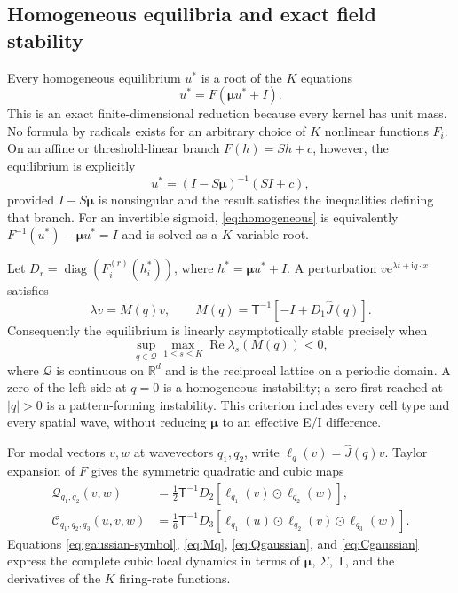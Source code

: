 \documentclass[11pt]{article}
\newcommand{\ii}{\mathrm{i}}
\newcommand{\ee}{\mathrm{e}}
\newcommand{\RePart}{\operatorname{Re}}
\newcommand{\T}{\mathsf T}
\newcommand{\Mu}{\bm{\mu}}
\newcommand{\cQ}{\mathcal Q}
\newcommand{\cC}{\mathcal C}
\begin{document}
\subsection{Homogeneous equilibria and exact field stability}

Every homogeneous equilibrium $u^*$ is a root of the $K$ equations
\begin{equation}
 u^*=F(\Mu u^*+I).
 \label{eq:homogeneous}
\end{equation}
This is an exact finite-dimensional reduction because every kernel has unit
mass.  No formula by radicals exists for an arbitrary choice of $K$ nonlinear
functions $F_i$.  On an affine or threshold-linear branch
$F(h)=Sh+c$, however, the equilibrium is explicitly
\begin{equation}
 u^*=(I-S\Mu)^{-1}(SI+c),
 \label{eq:affine-equilibrium}
\end{equation}
provided $I-S\Mu$ is nonsingular and the result satisfies the inequalities
defining that branch.  For an invertible sigmoid, \eqref{eq:homogeneous} is
equivalently $F^{-1}(u^*)-\Mu u^*=I$ and is solved as a $K$-variable root.

Let $D_r=\operatorname{diag}(F_i^{(r)}(h_i^*))$, where
$h^*=\Mu u^*+I$.  A perturbation $v\ee^{\lambda t+\ii q\cdot x}$ satisfies
\begin{equation}
 \lambda v=M(q)v,\qquad
 M(q)=\T^{-1}\left[-I+D_1\widehat J(q)\right].
 \label{eq:Mq}
\end{equation}
Consequently the equilibrium is linearly asymptotically stable precisely when
\begin{equation}
 \sup_{q\in\mathcal Q}\max_{1\leq s\leq K}
 \RePart\lambda_s(M(q))<0,
 \label{eq:exact-stability}
\end{equation}
where $\mathcal Q$ is continuous on $\mathbb R^d$ and is the reciprocal
lattice on a periodic domain.  A zero of the left side at $q=0$ is a
homogeneous instability; a zero first reached at $|q|>0$ is a pattern-forming
instability.  This criterion includes every cell type and every spatial wave,
without reducing $\Mu$ to an effective E/I difference.

For modal vectors $v,w$ at wavevectors $q_1,q_2$, write
$\ell_q(v)=\widehat J(q)v$.  Taylor expansion of $F$ gives the symmetric
quadratic and cubic maps
\begin{align}
 \cQ_{q_1,q_2}(v,w)
 &=\frac12\T^{-1}D_2
 \left[\ell_{q_1}(v)\odot\ell_{q_2}(w)\right],
 \label{eq:Qgaussian}\\
 \cC_{q_1,q_2,q_3}(u,v,w)
 &=\frac16\T^{-1}D_3
 \left[\ell_{q_1}(u)\odot\ell_{q_2}(v)\odot\ell_{q_3}(w)\right].
 \label{eq:Cgaussian}
\end{align}
Equations \eqref{eq:gaussian-symbol}, \eqref{eq:Mq},
\eqref{eq:Qgaussian}, and \eqref{eq:Cgaussian} express the complete cubic
local dynamics in terms of $\Mu$, $\Sigma$, $\T$, and the derivatives of the
$K$ firing-rate functions.
\end{document}
